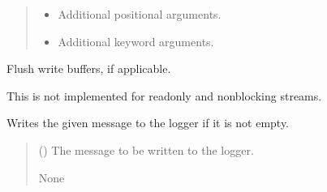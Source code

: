 \documentclass[a4paper,11pt,english,openany]{sphinxmanual}
\begin{document}
\begin{fulllineitems}
\begin{fulllineitems}
\begin{quote}
\begin{description}
\begin{itemize}
\item {} 
\sphinxAtStartPar
{} \textendash{} Additional positional arguments.

\item {} 
\sphinxAtStartPar
{} \textendash{} Additional keyword arguments.

\end{itemize}

\end{description}\end{quote}

\end{fulllineitems}


\begin{fulllineitems}
\label{\detokenize{api/spyice.utils.spyice_logger:src.spyice.utils.spyice_logger.SpyiceLogger.flush}}
\pysigstartsignatures
\pysiglinewithargsret
{}
{}
{}
\pysigstopsignatures
\sphinxAtStartPar
Flush write buffers, if applicable.

\sphinxAtStartPar
This is not implemented for read\sphinxhyphen{}only and non\sphinxhyphen{}blocking streams.

\end{fulllineitems}


\begin{fulllineitems}
\label{\detokenize{api/spyice.utils.spyice_logger:src.spyice.utils.spyice_logger.SpyiceLogger.write}}
\pysigstartsignatures
\pysiglinewithargsret
{}
{}
{}
\pysigstopsignatures
\sphinxAtStartPar
Writes the given message to the logger if it is not empty.
\begin{quote}\begin{description}
\sphinxAtStartPar
{} () \textendash{} The message to be written to the logger.

\sphinxAtStartPar
None

\end{description}\end{quote}

\end{fulllineitems}


\end{fulllineitems}
\end{document}
